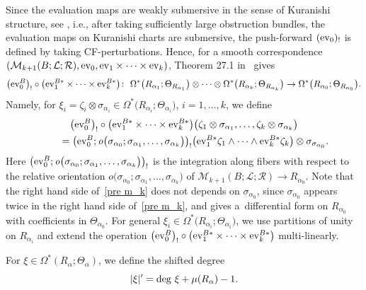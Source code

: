 \documentclass[pdftex]{sigma}
\numberwithin{equation}{section}
\theoremstyle{definition}
\begin{document}
Since the evaluation maps are weakly submersive in the sense of Kuranishi structure, see \mbox{\cite[Definition~3.40\,(5)]{FOOO20}},
i.e., after taking sufficiently large obstruction bundles,
the evaluation maps on Kuranishi charts are submersive, the push-forward $({\rm ev}_0)_!$ is defined by taking CF-perturbations.
Hence, for a smooth correspondence $({\mathcal M}_{k+1}(B;{\mathcal L};{\mathcal R}), {\rm ev}_0, {\rm ev}_1 \times \dots \times {\rm ev}_k)$, Theorem 27.1 in~\cite{FOOO20} gives
\begin{equation*}
\bigl({\rm ev}_0^B\bigr)_! \circ \bigl({\rm ev}_1^{B*} \times \dots \times {\rm ev}_k^{B*}\bigr) \colon \ \Omega^*\bigl(R_{\alpha_1};\Theta_{R_{\alpha_1}}\bigr) \otimes \dots \otimes \Omega^*\bigl(R_{\alpha_k};\Theta_{R_{\alpha_k}}\bigr) \to
\Omega^*\bigl(R_{\alpha_0};\Theta_{R_{\alpha_0}}\bigr).
\end{equation*}
Namely, for $\xi_i=\zeta_i \otimes \sigma_{\alpha_i} \in \Omega^*\big(R_{\alpha_i}; \Theta_{\alpha_i}\big)$, $i = 1, \dots, k$, we define
\begin{gather}
\bigl({\rm ev}_0^B\bigr)_! \circ \bigl({\rm ev}_1^{B*} \times \dots \times {\rm ev}_k^{B*}\bigr)\bigl(\zeta_1 \otimes \sigma_{\alpha_1}, \dots, \zeta_k \otimes \sigma_{\alpha_k}\bigr) \nonumber \\
\qquad{} = \bigl({\rm ev}^B_0; {\mathit o}\bigl(\sigma_{\alpha_0}; \sigma_{\alpha_1}, \dots, \sigma_{\alpha_k}\bigr)\bigr)_! \bigl({\rm ev}_1^{B*} \zeta_1 \wedge \dots \wedge {\rm ev}_k^{B*}\zeta_k\bigr) \otimes \sigma_{\sigma_{\alpha_0}}.\label{pre m_k}
\end{gather}
Here $\bigl({\rm ev}^B_0;{\mathit o}\bigl(\sigma_{\alpha_0}; \sigma_{\alpha_1}, \dots, \sigma_{\alpha_k}\bigr)\bigr)_! $ is the integration along fibers with respect to the relative orientation
${\mathit o}\bigl(\sigma_{\alpha_0}; \sigma_{\alpha_1}, \dots, \sigma_{\alpha_k}\bigr)$ of ${\mathcal M}_{k+1}(B; {\mathcal L}; {\mathcal R}) \to R_{\alpha_0}$.
Note that the right hand side of~\eqref{pre m_k} does not depends on $\sigma_{\alpha_0}$, since $\sigma_{\alpha_0}$ appears twice in the right hand side of~\eqref{pre m_k}, and
gives a~differential form on $R_{\alpha_0}$ with coefficients in $\Theta_{\alpha_0}$.
For general $\xi_i \in \Omega^*\bigl(R_{\alpha_i}; \Theta_{\alpha_i}\bigr)$, we use partitions of unity on $R_{\alpha_i}$ and extend the operation
$\bigl({\rm ev}_0^B\bigr)_! \circ \bigl({\rm ev}_1^{B*} \times \dots \times {\rm ev}_k^{B*}\bigr)$ multi-linearly.

For $\xi \in \Omega^*(R_{\alpha};\Theta_{\alpha})$, we define the shifted degree
\begin{equation}\label{degree}
\vert \xi \vert' = {\rm deg~ }\xi + \mu(R_{\alpha}) -1.
\end{equation}
\end{document}
